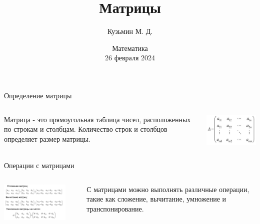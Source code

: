 \documentclass[mathserif, serif, 11pt]{beamer}
\title[Матрицы]{Матрицы}
\author[Фамилия]{Кузьмин М. Д.}
\institute[МГУ]
{
	Естественно-научный факультет МГУ им.~М.\,В.~Ломоносова
}
\date[Февраль 2024]
{
	Математика\\
	26 февраля 2024
}
\begin{document}
	
	\frame{\titlepage}
	
	\begin{frame}{Определение матрицы}
		\begin{columns}
			\begin{column}{6cm}
				Матрица - это прямоугольная таблица чисел, расположенных по строкам и столбцам. Количество строк и столбцов определяет размер матрицы.
			\end{column}
			\begin{column}{6cm}
				\includegraphics[width=6cm]{matrix.jpg}
			\end{column}
		\end{columns}
	\end{frame}
	
	\begin{frame}{Операции с матрицами}
		\begin{columns}
			\begin{column}{6cm}
				\includegraphics[width=7cm]{oper.jpg}
			\end{column}
			\begin{column}{1cm}
			\end{column}
			\begin{column}{4cm}
				С матрицами можно выполнять различные операции, такие как сложение, вычитание, умножение и транспонирование.
			\end{column}
		\end{columns}
	\end{frame}
	
\end{document}
